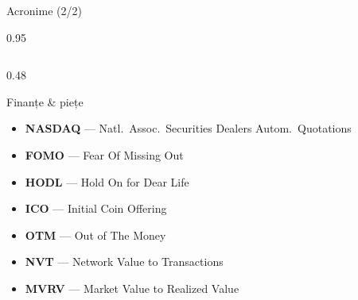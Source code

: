 \documentclass[9pt, aspectratio=169, t]{beamer}
\begin{document}
\begin{frame}{Acronime (2/2)}
\begin{cminipage}{0.95\textwidth}
{\begin{columns}[T]
\begin{column}{0.48\textwidth}
\begin{alertblock}{Finanțe \& piețe}
\begin{itemize}
                    \item \textbf{NASDAQ} --- Natl.\ Assoc.\ Securities Dealers Autom.\ Quotations
                    \item \textbf{FOMO} --- Fear Of Missing Out
                    \item \textbf{HODL} --- Hold On for Dear Life
                    \item \textbf{ICO} --- Initial Coin Offering
                    \item \textbf{OTM} --- Out of The Money
                    \item \textbf{NVT} --- Network Value to Transactions
                    \item \textbf{MVRV} --- Market Value to Realized Value
                \end{itemize}
            \end{alertblock}
        \end{column}
    \end{columns}
    }
    \end{cminipage}
\end{frame}
\end{document}
